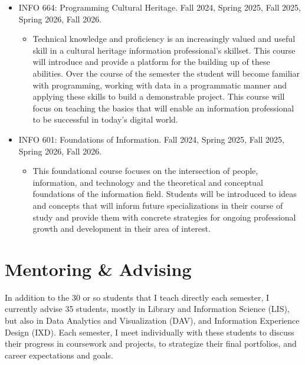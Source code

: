 \documentclass[12pt]{article}
\begin{document}
\begin{itemize}
\begin{itemize}
automated systems in a world increasingly shaped by AI and
algorithmic decision-making. This course is intended for students
interested in both technical development and the social impacts of
automation.
\end{itemize}
\item INFO 664: Programming Cultural Heritage. Fall 2024, Spring 2025,
Fall 2025, Spring 2026, Fall 2026.
\begin{itemize}
\item Technical knowledge and proficiency is an increasingly valued and
useful skill in a cultural heritage information professional’s
skillset. This course will introduce and provide a platform for
the building up of these abilities. Over the course of the
semester the student will become familiar with programming,
working with data in a programmatic manner and applying these
skills to build a demonstrable project. This course will focus on
teaching the basics that will enable an information professional
to be successful in today’s digital world.
\end{itemize}
\item INFO 601: Foundations of Information. Fall 2024, Spring 2025,
Fall 2025, Spring 2026, Fall 2026.
\begin{itemize}
\item This foundational course focuses on the intersection of people,
information, and technology and the theoretical and conceptual
foundations of the information field. Students will be introduced
to ideas and concepts that will inform future specializations in
their course of study and provide them with concrete strategies
for ongoing professional growth and development in their area of
interest.
\end{itemize}
\end{itemize}

\section*{Mentoring \& Advising}
\label{sec:org2b3e3f1}
In addition to the 30 or so students that I teach directly each
semester, I currently advise 35 students, mostly in Library and
Information Science (LIS), but also in Data Analytics and
Visualization (DAV), and Information Experience Design (IXD). Each
semester, I meet individually with these students to discuss their
progress in coursework and projects, to strategize their final
portfolios, and career expectations and goals.
\end{document}
